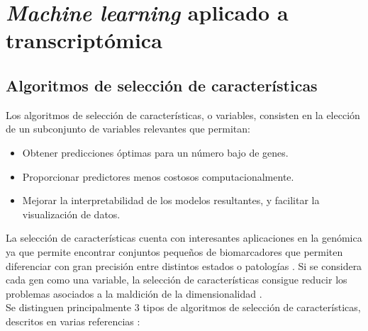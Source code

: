 \chapter{\textit{Machine learning} aplicado a transcriptómica}

\section{Algoritmos de selección de características}

Los algoritmos de selección de características, o variables, consisten en la elección de un subconjunto de variables relevantes que permitan:

\begin{itemize}
	\item Obtener predicciones óptimas para un número bajo de genes.
	\item Proporcionar predictores menos costosos computacionalmente.
	\item Mejorar la interpretabilidad de los modelos resultantes, y facilitar la visualización de datos.
\end{itemize} 

La selección de características cuenta con interesantes aplicaciones en la genómica ya que permite encontrar conjuntos pequeños de biomarcadores que permiten diferenciar con gran precisión entre distintos estados o patologías \cite{Xing, Tadist2019}. Si se considera cada gen como una variable, la selección de características consigue reducir los problemas asociados a la maldición de la dimensionalidad \cite{Bellman1957, Bellman1961}. \\

Se distinguen principalmente 3 tipos de algoritmos de selección de características, descritos en varias referencias \cite{HerreraMaldonado2020, Tadist2019}:

